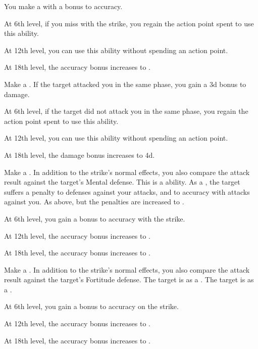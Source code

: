         {
             You make a  with a  bonus to accuracy.
            \par At 6th level, if you miss with the strike, you regain the action point spent to use this ability.
            \par At 12th level, you can use this ability without spending an action point.
            \par At 18th level, the accuracy bonus increases to .

             Make a .
            If the target attacked you in the same phase, you gain a \plus3d bonus to damage.
            \par At 6th level, if the target did not attack you in the same phase, you regain the action point spent to use this ability.
            \par At 12th level, you can use this ability without spending an action point.
            \par At 18th level, the damage bonus increases to \plus4d.

             Make a .
            In addition to the strike's normal effects, you also compare the attack result against the target's Mental defense.
            This is a  ability.
             As a , the target suffers a  penalty to defenses against your attacks, and to accuracy with attacks against you.
             As above, but the penalties are increased to .
            \par At 6th level, you gain a  bonus to accuracy with the strike.
            \par At 12th level, the accuracy bonus increases to .
            \par At 18th level, the accuracy bonus increases to .

             Make a .
            In addition to the strike's normal effects, you also compare the attack result against the target's Fortitude defense.
             The target is \sickened as a .
             The target is \nauseated as a .
            \par At 6th level, you gain a  bonus to accuracy on the strike.
            \par At 12th level, the accuracy bonus increases to .
            \par At 18th level, the accuracy bonus increases to .

}
